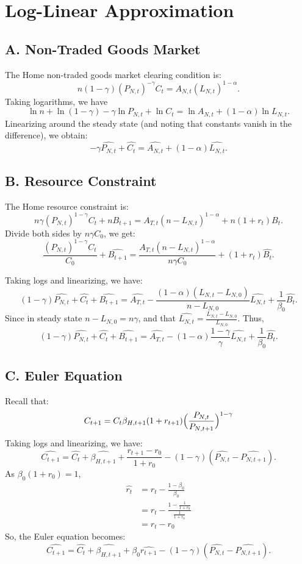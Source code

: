 \documentclass[a4paper,12pt]{article} %
\theoremstyle{nonitalic}
\begin{document}
\section{Log-Linear Approximation}
\subsection*{A. Non-Traded Goods Market}
The Home non-traded goods market clearing condition is:
\[
n(1-\gamma)(P_{N,t})^{-\gamma}C_t = A_{N,t}(L_{N,t})^{1-\alpha}.
\]
Taking logarithms, we have
\[
\ln n + \ln(1-\gamma) - \gamma\ln P_{N,t} + \ln C_t = \ln A_{N,t} + (1-\alpha)\ln L_{N,t}.
\]
Linearizing around the steady state (and noting that constants vanish in the difference), we obtain:
\[
\boxed{-\gamma  \widehat{P_{N,t}} + \widehat{C_t} =  \widehat{A_{N,t}} + (1-\alpha)  \widehat{L_{N,t}}. \tag{7a}}
\]

\subsection*{B. Resource Constraint}
The Home resource constraint is:
\[
n\gamma (P_{N,t})^{1-\gamma}C_t + nB_{t+1} = A_{T,t}(n-L_{N,t})^{1-\alpha}+ n(1+r_t)B_t.
\]
Divide both sides by $n \gamma C_0$, we get:
\[
\frac{(P_{N,t})^{1-\gamma}C_t}{C_0} + \widehat{B_{t+1}} = \frac{A_{T,t}(n-L_{N,t})^{1-\alpha}}{n\gamma C_0} + (1+r_t)\widehat{B_t}.
\]

Taking logs and linearizing, we have:
\[
(1-\gamma)  \widehat{P_{N,t}} + \widehat{C_t} + \widehat{B_{t+1}} = \widehat{A_{T,t}} - \frac{(1-\alpha)(L_{N,t} - L_{N,0})}{n-L_{N,0}}  \widehat{L_{N,t}} + \frac{1}{\beta_0} \widehat{B_t}.
\]
Since in steady state $n-L_{N,0}= n\gamma$, and that $\widehat{L_{N,t}} = \frac{L_{N,t} - L_{N,0}}{L_{N,0}}$. Thus,
\[
\boxed{(1-\gamma)  \widehat{P_{N,t}} + \widehat{C_t} + \widehat{B_{t+1}} = \widehat{A_{T,t}} - (1-\alpha) \frac{1 - \gamma}{\gamma} \widehat{L_{N,t}} + \frac{1}{\beta_0} \widehat{B_t}. \tag{7c}}
\]


\subsection*{C. Euler Equation}
Recall that:
\[
C_{t+1} = C_t \beta_{H, t+1}(1+r_{t+1})\Bigl(\frac{P_{N,t}}{P_{N,t+1}}\Bigr)^{1-\gamma}
\]
Taking logs and linearizing, we have:
\[
\widehat{C_{t+1}} = \widehat{C_t} + \widehat{\beta_{H,t+1}} + \frac{r_{t+1}-r_0}{1+r_0} - (1-\gamma)( \widehat{P_{N,t}}- \widehat{P_{N,t+1}}).
\]
As $\beta_0(1+r_0) = 1$,
\begin{align*}
    \widehat{r_t} &= r_t - \frac{1-\beta_0}{\beta_0} \\
    &= r_t - \frac{1-\frac{1}{1+r_0}}{\frac{1}{1+r_0}} \\
    &= r_t - r_0
\end{align*}
So, the Euler equation becomes:
\[
\boxed{\widehat{C_{t+1}} = \widehat{C_t} + \widehat{\beta_{H,t+1}} + \beta_0  \widehat{r_{t+1}} - (1-\gamma)( \widehat{P_{N,t}}- \widehat{P_{N,t+1}}). \tag{7e}}
\]
\end{document}
